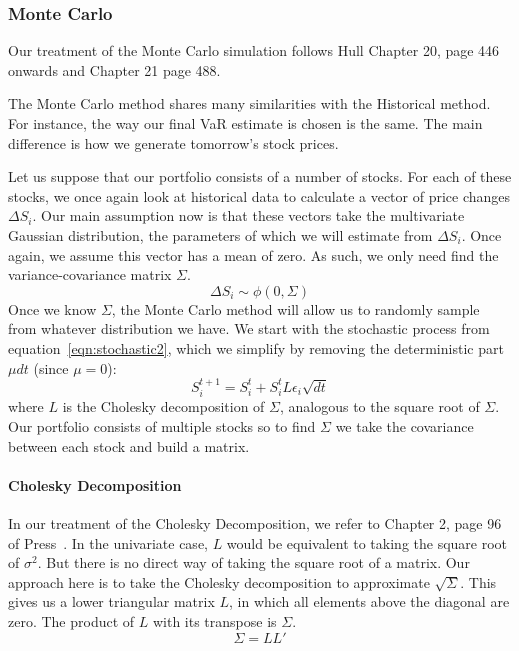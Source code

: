 \documentclass[../Dissertation.tex]{subfiles}
\begin{document}
\subsubsection{Monte Carlo}
\label{section:montecarlo}

Our treatment of the Monte Carlo simulation follows Hull \cite{Hull:2012} Chapter 20, page 446 onwards and Chapter 21 page 488.

The Monte Carlo method shares many similarities with the Historical method.
For instance, the way our final VaR estimate is chosen is the same.
The main difference is how we generate tomorrow's stock prices.

Let us suppose that our portfolio consists of a number of stocks.
For each of these stocks, we once again look at historical data to calculate a vector of price changes $\Delta S_i$.
Our main assumption now is that these vectors take the multivariate Gaussian distribution, the parameters of which we will estimate from $\Delta S_i$.
Once again, we assume this vector has a mean of zero.
As such, we only need find the variance-covariance matrix $\Sigma$.
					\begin{equation}
						\label{eqn:multivariategaussian}
						\Delta S_{i}\sim\phi(0,\Sigma)
					\end{equation}
Once we know $\Sigma$, the Monte Carlo method will allow us to randomly sample from whatever distribution we have.
We start with the stochastic process from equation~\ref{eqn:stochastic2}, which we simplify by removing the deterministic part $\mu dt$ (since $\mu = 0$):
					\begin{equation}
						\label{eqn:montecarlo}
						S_i^{t+1} = S_i^t + S_i^t L\epsilon_i\sqrt{dt}
					\end{equation}	
where $L$ is the Cholesky decomposition of $\Sigma$, analogous to the square root of $\Sigma$. 
Our portfolio consists of multiple stocks so to find $\Sigma$ we take the covariance between each stock and build a matrix.

\paragraph{Cholesky Decomposition}

In our treatment of the Cholesky Decomposition, we refer to Chapter 2, page 96 of Press~\cite{Press:1992}.
In the univariate case, $L$ would be equivalent to taking the square root of $\sigma^2$. 
But there is no direct way of taking the square root of a matrix.
Our approach here is to take the Cholesky decomposition to approximate $\sqrt{\Sigma}$.
This gives us a lower triangular matrix $L$, in which all elements above the diagonal are zero.
The product of $L$ with its transpose is $\Sigma$.
					\begin{equation}
						\label{eqn:cholesky}
						\Sigma = LL'
					\end{equation}
					
\end{document}
